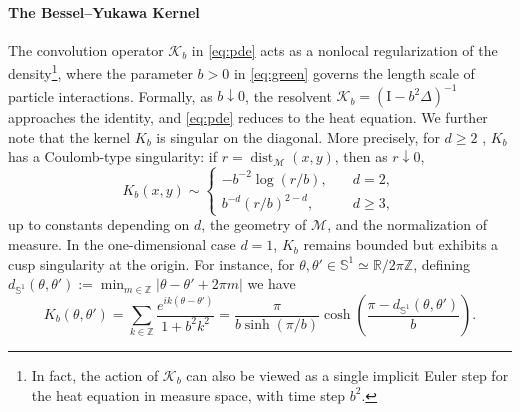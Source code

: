 \documentclass[11pt]{article}
\theoremstyle{definition}
\newcommand{\Sphere}{\mathbb{S}}
\def\Kb{\mathcal K_b}
\def\M{\mathcal M}
\def\I{\mathrm{I}}
\begin{document}
\paragraph{The Bessel--Yukawa Kernel}
The convolution operator \(\Kb\) in \eqref{eq:pde} acts as a nonlocal regularization of the density\footnote{In fact, the action of $\Kb$ can also be viewed as a single implicit Euler step for the heat equation in measure space, with time step $b^2$.},
where the parameter \(b>0\) in \eqref{eq:green} governs the length scale of particle interactions. 
Formally, as \(b\downarrow0\), the resolvent \(\Kb=(\I-b^2\Delta)^{-1}\) approaches the identity, and \eqref{eq:pde} reduces to the heat equation.
We further note that the kernel \(K_b\) is singular on the diagonal. More precisely, for $d \geq 2$ , \(K_b\) has a Coulomb-type singularity: if \(r=\operatorname{dist}_{\M}(x,y)\), then as \(r\downarrow0\), 
\begin{equation} 
\label{eq:kernel_singularity}
K_b(x,y)\sim \begin{cases} -b^{-2}\log\!\left(r/b\right), \quad& d=2,\\ b^{-d}(r/b)^{2-d}, & d\ge3, \end{cases} \end{equation}
up to constants depending on \(d\), the geometry of \(\M\), and the normalization of measure. 
In the one-dimensional case $d = 1$,  \(K_b\) remains bounded but exhibits a cusp singularity at the origin. For instance, for \(\theta, \theta'  \in \Sphere^1\simeq\mathbb R/2\pi\mathbb Z\), defining $d_{\Sphere^1}(\theta,\theta') := \min_{m\in\mathbb Z}
\left|\theta-\theta'+2\pi m\right|$ we have
\begin{equation} 
\label{eq:explicit_circle_resolvent_kernel}
K_b(\theta, \theta') = \sum_{k\in\mathbb Z}\frac{e^{ik(\theta- \theta')}}{1+b^2k^2} = \frac{\pi}{b\sinh(\pi/b)} \cosh\!\left(\frac{\pi-d_{\Sphere^1}(\theta,\theta')}{b}\right). \end{equation}
\end{document}

